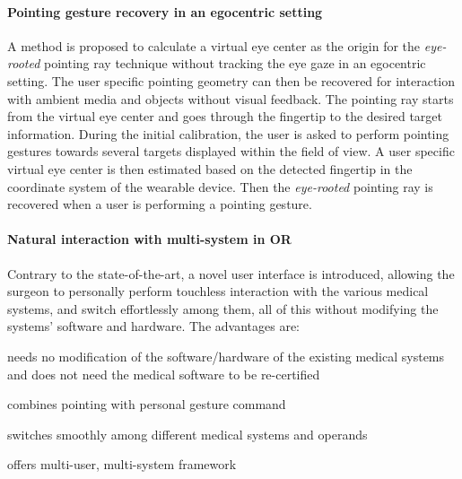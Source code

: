 \paragraph{Pointing gesture recovery in an egocentric setting}  
A method is proposed to calculate a virtual eye center as the origin for the \textit{eye-rooted} pointing ray technique without tracking the eye gaze in an egocentric setting. The user specific pointing geometry can then be recovered for interaction with ambient media and objects without visual feedback. The pointing ray starts from the virtual eye center and goes through the fingertip to the desired target information. During the initial calibration, the user is asked to perform pointing gestures towards several targets displayed within the field of view. A user specific virtual eye center is then estimated based on the detected fingertip in the coordinate system of the wearable device. Then the \textit{eye-rooted} pointing ray is recovered when a user is performing a pointing gesture. 

\paragraph{Natural interaction with multi-system in OR}
Contrary to the state-of-the-art, a novel user interface is introduced, allowing the surgeon to {personally} perform touchless interaction with the {various} medical systems, and switch effortlessly among them, all of this {without modifying} the systems' software and hardware. The advantages are: 

\begin{description} [font=$\bullet$\scshape\bfseries]
	\item needs no modification of the software/hardware of the existing medical systems and does not need the medical software to be re-certified
	\item combines pointing with personal gesture command
	\item switches smoothly among different medical systems and operands
	\item offers multi-user, multi-system framework
\end{description}

